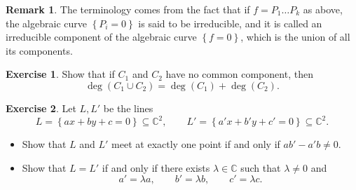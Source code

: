 \documentclass{article}
\newcommand{\C}{\mathbb{C}}
\newcommand{\rb}[1]{\left( #1 \right)}
\newcommand{\cb}[1]{\left\{ #1 \right\}}
\theoremstyle{definition}\newtheorem{definition}{Definition}[section]
\theoremstyle{definition}\newtheorem{notation}[definition]{Notation}
\theoremstyle{definition}\newtheorem{remark}[definition]{Remark}
\theoremstyle{definition}\newtheorem{example1}[definition]{Example}
\theoremstyle{definition}\newtheorem{fact}{Fact}
\theoremstyle{definition}\newtheorem{exercise}{Exercise}
\theoremstyle{definition}\newtheorem*{example2}{Example}
\begin{document}
\begin{remark}
The terminology comes from the fact that if $ f = P_1 \dots P_k $ as above, the algebraic curve $ \cb{P_i = 0} $ is said to be irreducible, and it is called an irreducible component of the algebraic curve $ \cb{f = 0} $, which is the union of all its components.
\end{remark}

\begin{exercise}
Show that if $ C_1 $ and $ C_2 $ have no common component, then
$$ \deg\rb{C_1 \cup C_2} = \deg\rb{C_1} + \deg\rb{C_2}. $$
\end{exercise}

\begin{exercise}
Let $ L, L' $ be the lines
$$ L = \cb{ax + by + c = 0} \subseteq \C^2, \qquad L' = \cb{a'x + b'y + c' = 0} \subseteq \C^2. $$
\begin{itemize}
\item Show that $ L $ and $ L' $ meet at exactly one point if and only if $ ab' - a'b \ne 0 $.
\item Show that $ L = L' $ if and only if there exists $ \lambda \in \C $ such that $ \lambda \ne 0 $ and
$$ a' = \lambda a, \qquad b' = \lambda b, \qquad c' = \lambda c. $$
\end{itemize}
\end{exercise}
\end{document}
